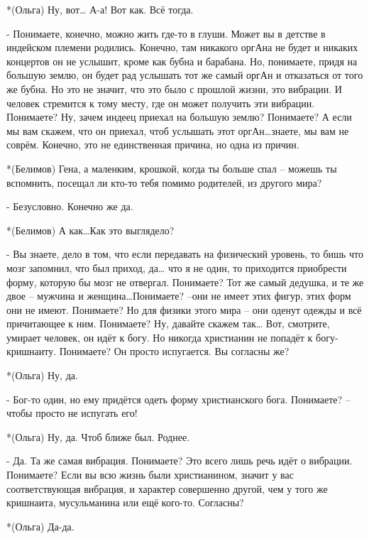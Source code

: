 *(Ольга) Ну, вот… А-а! Вот как. Всё тогда.

- Понимаете, конечно, можно жить где-то в глуши. Может вы в детстве в индейском племени родились. Конечно, там никакого оргАна не будет и никаких концертов он не услышит, кроме как бубна и барабана. Но, понимаете, придя на большую землю, он будет рад услышать тот же самый оргАн и отказаться от того же бубна. Но это не значит, что это было с прошлой жизни, это вибрации. И человек стремится к тому месту, где он может получить эти вибрации. Понимаете? Ну, зачем индеец приехал на большую землю? Понимаете? А если мы вам скажем, что он приехал, чтоб услышать этот оргАн…знаете, мы вам не соврём. Конечно, это не единственная причина, но одна из причин.

*(Белимов) Гена, а маленким, крошкой, когда ты больше спал – можешь ты вспомнить, посещал ли кто-то тебя помимо родителей, из другого мира?

- Безусловно. Конечно же да.

*(Белимов) А как…Как это выглядело?

- Вы знаете, дело в том, что если передавать на физический уровень, то бишь что мозг запомнил, что был приход, да… что я не один, то приходится приобрести форму, которую бы мозг не отвергал. Понимаете? Тот же самый дедушка, и те же двое – мужчина и женщина…Понимаете? –они не имеет этих фигур, этих форм они не имеют. Понимаете? Но для физики этого мира – они оденут одежды и всё причитающее к ним. Понимаете?  Ну, давайте скажем так… Вот, смотрите, умирает человек, он идёт к богу. Но никогда христианин не попадёт к богу-кришнаиту. Понимаете? Он просто испугается. Вы согласны же?

*(Ольга) Ну, да.

- Бог-то один, но ему придётся одеть форму христианского бога. Понимаете? – чтобы просто не испугать его!

*(Ольга)  Ну, да. Чтоб ближе был. Роднее.

- Да. Та же самая вибрация. Понимаете? Это всего лишь речь идёт о вибрации. Понимаете? Если вы всю жизнь были христианином, значит у вас соответствующая вибрация, и характер  совершенно другой, чем у того же кришнаита, мусульманина или ещё кого-то. Согласны?

*(Ольга) Да-да.

